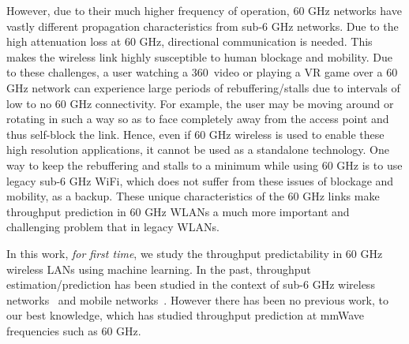 \documentclass[sigconf,anonymous]{acmart}
\begin{document}
However, due to their much higher frequency of operation, 60 GHz networks have vastly different propagation characteristics from sub-6 GHz networks. Due to the high attenuation loss at 60 GHz, directional communication is needed. This makes the wireless link highly susceptible to human blockage and mobility. Due to these challenges, a user watching a 360\degree~video or playing a VR game over a 60 GHz network can experience large periods of rebuffering/stalls due to intervals of low to no 60 GHz connectivity. For example, the user may be moving around or rotating in such a way so as to face completely away from the access point and thus self-block the link. Hence, even if 60 GHz wireless is used to enable these high resolution applications, it cannot be used as a standalone technology. One way to keep the rebuffering and stalls to a minimum while using 60 GHz is to use legacy sub-6 GHz WiFi, which does not suffer from these issues of blockage and mobility, as a backup. %
These unique characteristics of the 60 GHz links make throughput prediction in 60 GHz WLANs a much more important and challenging problem that in legacy WLANs.

In this work, \textit{for first time}, we study the throughput predictability in 60 GHz wireless LANs using machine learning. In the past, throughput estimation/prediction has been studied in the context of sub-6 GHz wireless networks~\cite{khan:infocom2016,song:secon2017,kajita:wmnc2015} and mobile networks~\cite{liu:globecom2015}. However there has been no previous work, to our best knowledge, which has studied throughput prediction at mmWave frequencies such as 60 GHz. 
\end{document}
